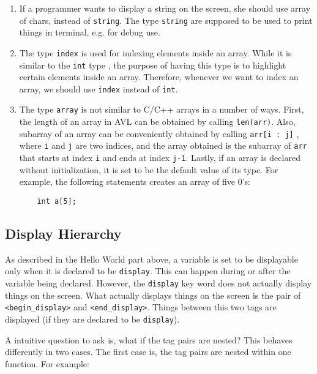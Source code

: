 \begin{enumerate}
\item
If a programmer wants to display a string on the screen, she should use array of chars, instead of
\verb"string". The type \verb"string" are supposed to be used to print things in terminal, e.g. for
debug use.

\item
The type \verb"index" is used for indexing elements inside an array. While it is similar to the
\verb"int" type , the purpose of having this type is to highlight certain elements inside an array.
Therefore, whenever we want to index an array, we should use \verb"index" instead of \verb"int".

\item
The type \verb"array" is not similar to C/C++ arrays in a number of ways.  First, the length of an
array in AVL can be obtained by calling \verb"len(arr)". Also, subarray of an array can be
conveniently obtained by calling \verb"arr[i : j]" , where \verb"i" and \verb"j" are two indices,
and the array obtained is the subarray of \verb"arr" that starts at index \verb"i" and ends at index
\verb"j-1". Lastly, if an array is declared without initialization, it is set to be the default
value of its type. For example, the following statements creates an array of five 0’s:

\begin{verbatim}
    int a[5];
\end{verbatim}

\end{enumerate}

\subsection{Display Hierarchy}

As described in the Hello World part above, a variable is set to be displayable only when it is
declared to be \verb"display". This can happen during or after the variable being declared. However,
the \verb"display" key word does not actually display things on the screen. What actually displays
things on the screen is the pair of \verb"<begin_display>" and \verb"<end_display>". Things between
this two tags are displayed (if they are declared to be \verb"display").

A intuitive question to ask is, what if the tag pairs are nested?  This behaves differently in two
cases. The first case is, the tag pairs are nested within one function. For example:

